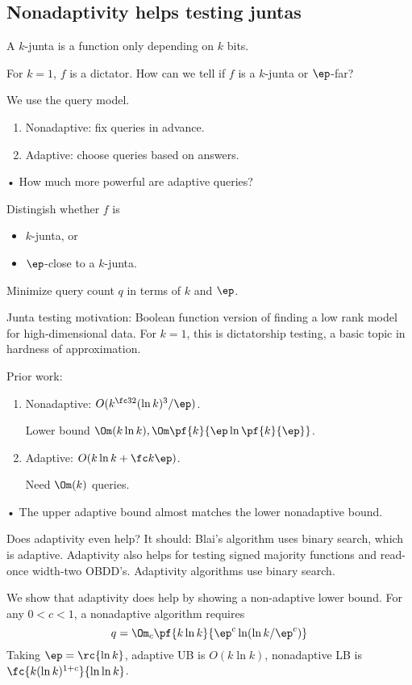 \subsection{Nonadaptivity helps testing juntas}

A $k$-junta is a function only depending on $k$ bits.

For $k=1$, $f$ is a dictator. How can we tell if $f$ is a $k$-junta or $\ep$-far?

We use the query model. 
\begin{enumerate}
\item
Nonadaptive: fix queries in advance.
\item
Adaptive: choose queries based on answers.
\end{enumerate}•
How much more powerful are adaptive queries?

Distingish whether $f$ is 
\begin{itemize}
\item
$k$-junta, or
\item $\ep$-close to a $k$-junta.
\end{itemize}

Minimize query count $q$ in terms of $k$ and $\ep$. 

Junta testing motivation: Boolean function version of finding a low rank model for high-dimensional data.
For $k=1$, this is dictatorship testing, a basic topic in hardness of approximation.

Prior work:
\begin{enumerate}
\item
Nonadaptive: $O(k^{\fc 32}(\ln k)^3/\ep)$.

Lower bound $\Om(k\ln k), \Om\pf{k}{\ep\ln \pf{k}{\ep}}$.
\item
Adaptive: $O(k\ln k + \fc k{\ep})$.

Need $\Om(k)$ queries.
\end{enumerate}•
The upper adaptive bound almost matches the lower nonadaptive bound.

Does adaptivity even help? It should: Blai's algorithm uses binary search, which is adaptive. Adaptivity also helps for testing signed majority functions and read-once width-two OBDD's. Adaptivity algorithms use binary search.

We show that adaptivity does help by showing a non-adaptive lower bound. For any $0<c<1$, a nonadaptive algorithm requires
\[
q=\Om_c \pf{k\ln k}{\ep^c \ln (\ln k/\ep^c)}
\]
Taking $\ep=\rc{\ln k}$, adaptive UB is $O(k\ln k)$, nonadaptive LB is $\fc{k(\ln k)^{1+c}}{\ln\ln k}$.


